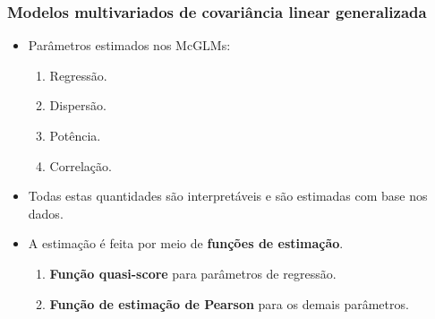 \documentclass[10pt,
  aspectratio=169,
  serif,
  mathserif,
  professionalfont,
  compress,
  handout,
  ]{beamer}\usepackage[]{graphicx}\usepackage[]{color}
\begin{document}
\begin{frame}
\frametitle{Modelos multivariados de covariância linear generalizada}

\begin{itemize}

\itemsep 2ex
  
  \item Parâmetros estimados nos McGLMs:
    \begin{enumerate}
      \item Regressão.
      \item Dispersão.
      \item Potência.
      \item Correlação.
    \end{enumerate}
  
  \item Todas estas quantidades são interpretáveis e são estimadas com base nos dados.
  
  \item A estimação é feita por meio de \textbf{funções de estimação}.
    \begin{enumerate}
      \item \textbf{Função quasi-score} para parâmetros de regressão. 
      \item \textbf{Função de estimação de Pearson} para os demais parâmetros. 
    \end{enumerate}

\end{itemize}

\end{frame}

\end{document}
